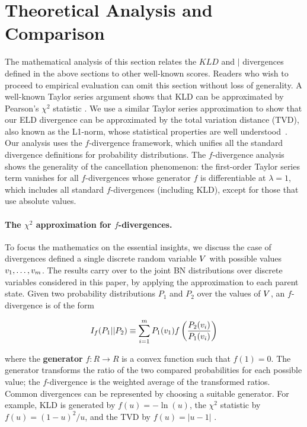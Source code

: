 {\section{Theoretical Analysis and Comparison}
The mathematical analysis of this section relates the $KLD$ and $\mid$ divergences defined in the above sections to other well-known scores. Readers who wish to proceed to empirical evaluation can omit this section without loss of generality. A well-known Taylor series argument shows that KLD can be approximated by Pearson's $\chi^{2}$ statistic \cite{Nielsen2014}. We use a similar Taylor series approximation to show that our ELD divergence can be approximated by the total variation distance (TVD), also known as the L1-norm, whose statistical properties are well understood~\cite{Beirlant2001,Beirlant1994}. 
Our analysis uses the $f$-divergence framework, which unifies all the standard divergence definitions for probability distributions. The $f$-divergence analysis shows the generality of the cancellation phenomenon: the first-order Taylor series term vanishes for all $f$-divergences whose generator $f$ is differentiable at $\lambda = 1$, which includes all standard $f$-divergences (including KLD), except for those that use absolute values. 

\paragraph{The $\chi^2$ approximation for $f$-divergences.}
To focus the mathematics on the essential insights, we discuss the case of divergences defined a single discrete random variable $V$ with possible values $v_{1},\ldots,v_{m}$. The results carry over to the joint BN distributions over discrete variables considered in this paper, by applying the approximation to each parent state. Given two probability distributions $P_{1}$ and $P_{2}$ over the values of $V$, an $f$-divergence is of the form 

\begin{equation}
\label{eq:f-divergence}
I_{f}(P_{1}||P_{2}) \equiv \sum_{i=1}^{m} P_{1}(v_{1}) f\left(\frac{P_{2}(v_{i})}{P_{1}(v_{i})}\right)
\end{equation}

where the \textbf{generator} $f:R \rightarrow R$ is a convex function such that $f(1)=0$. 
The generator transforms the ratio of the two compared probabilities for each possible value; the $f$-divergence is the weighted average of the transformed ratios. Common divergences can be represented by choosing a suitable generator. For example, KLD is generated by $f(u) = -\ln(u)$, the $\chi^{2}$ statistic by $f(u) = (1-u)^{2}/u$, and the TVD by $f(u) = |u-1|$ \cite{Nielsen2014}. 

}
